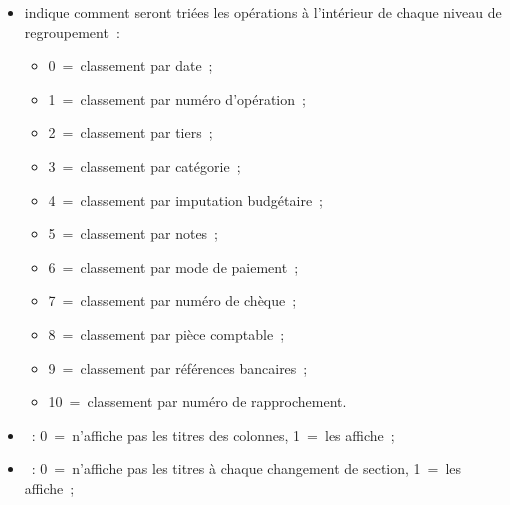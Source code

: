 \begin{itemize}
\begin{itemize}
		\item  {}

		\item  {}
      
		\end{itemize} 

\item  {} indique comment seront triées les opérations à l'intérieur de chaque niveau de regroupement~:

		\begin{itemize}

		\item 0~=~classement par date~;

		\item 1~=~classement par numéro d'opération~; 

		\item 2~=~classement par tiers~;

		\item 3~=~classement par catégorie~;

		\item 4~=~classement par imputation budgétaire~;

		\item 5~=~classement par notes~;

		\item 6~=~classement par mode de paiement~;

		\item 7~=~classement par numéro de chèque~;

		\item 8~=~classement par pièce comptable~;

		\item 9~=~classement par références bancaires~;

		\item 10~=~classement par numéro de rapprochement.
		
		\end{itemize} 

\item  {}~: 0~=~n'affiche pas les titres des colonnes, 1~=~les affiche~;

\item  {}~: 0~=~n'affiche pas les titres à chaque changement de section, 1~=~les affiche~;


\end{itemize}
